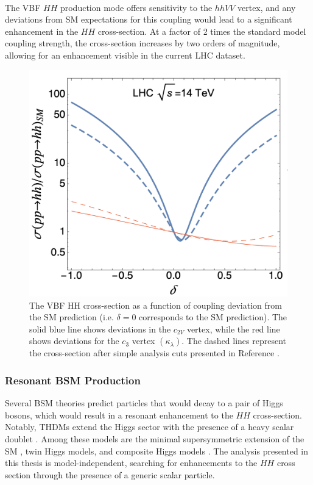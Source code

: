 \\
\indent The \gls{VBF} $HH$ production mode offers sensitivity to the $hhVV$ vertex, and any deviations from \gls{SM} expectations for this coupling would lead to a significant enhancement in the $HH$ cross-section. At a factor of 2 times the standard model coupling strength, the cross-section increases by two orders of magnitude, allowing for an enhancement visible in the current \gls{LHC} dataset.


\begin{figure}[!ht]
    \centering
    \includegraphics[width=.7\textwidth]{chapters/chapter1_theory/images/coupling_xsec.png}
    \caption[The VBF HH cross-section as a function of coupling deviation from the \gls{SM} prediction]{The VBF HH cross-section as a function of coupling deviation from the \gls{SM} prediction (i.e. $\delta=0$ corresponds to the \gls{SM} prediction). The solid blue line shows deviations in the $c_{2V}$ vertex, while the red line shows deviations for the $c_{3}$ vertex $(\kappa_\lambda)$. The dashed lines represent the cross-section after simple analysis cuts presented in Reference \cite{vbfhh}.}
    \label{fig:c2v-xsec}
\end{figure}



\subsubsection{Resonant BSM Production}

Several \gls{BSM} theories predict particles that would decay to a pair of Higgs bosons, which would result in a resonant enhancement to the $HH$ cross-section. Notably, \glspl{THDM} extend the Higgs sector with the presence of a heavy scalar doublet \cite{THDM}. Among these models are the minimal supersymmetric extension of the \gls{SM} \cite{mssm}, twin Higgs models, and composite Higgs models \cite{compositeHiggs}. The analysis presented in this thesis is model-independent, searching for enhancements to the $HH$ cross section through the presence of a generic scalar particle.

